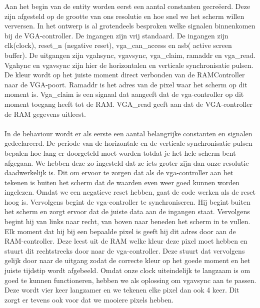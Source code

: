 \documentclass{scrartcl}  %
\begin{document}
Aan het begin van de entity worden eerst een aantal constanten gecreëerd. Deze zijn afgesteld op de grootte van ons resolutie en hoe snel we het scherm willen verversen. In het ontwerp is al grotendeels besproken welke signalen binnenkomen bij de VGA-controller. De ingangen zijn vrij standaard. De ingangen zijn clk(clock), reset\_n (negative reset), vga\_can\_access en asb( active screen buffer). De uitgangen zijn vgahsync, vgavsync, vga\_claim, ramaddr en vga\_read. Vgahync en vgavsync zijn hier de horizontalen en verticale synchronisatie pulsen. De kleur wordt op het juiste moment direct verbonden van de RAMController naar de VGA-poort. Ramaddr is het adres van de pixel waar het scherm op dit moment is. Vga\_claim is een signaal dat aangeeft dat de vga-controller op dit moment toegang heeft tot de RAM. VGA\_read geeft aan dat de VGA-controller de RAM gegevens uitleest.
\\\\
In de behaviour wordt er als eerste  een aantal belangrijke constanten en signalen gedeclareerd. De periode van de horizontale en de verticale synchronisatie pulsen bepalen hoe lang er doorgeteld moet worden totdat je het hele scherm bent afgegaan. We hebben deze zo ingesteld dat ze iets groter zijn dan onze resolutie daadwerkelijk is. Dit om ervoor te zorgen dat als de vga-controller aan het tekenen is buiten het scherm dat de waarden even weer goed kunnen worden ingelezen. Omdat we een negatieve reset hebben, gaat de code werken als de reset hoog is. Vervolgens begint de vga-controller te synchroniseren. Hij begint buiten het scherm en zorgt ervoor dat de juiste data aan de ingangen staat. Vervolgens begint hij van links naar recht, van boven naar beneden het scherm in te vullen. Elk moment dat hij bij een bepaalde pixel is geeft hij dit adres door aan de RAM-controller. Deze leest uit de RAM welke kleur deze pixel moet hebben en stuurt dit rechtstreeks door naar de vga-controller. Deze stuurt dat vervolgens gelijk door naar de uitgang zodat de correcte kleur op het goede moment en het juiste tijdstip wordt afgebeeld. Omdat onze clock uiteindelijk te langzaam is om goed te kunnen functioneren, hebben we als oplossing om vgavsync aan te passen. Deze wordt vier keer langzamer en we tekenen elke pixel dan ook 4 keer. Dit zorgt er tevens ook voor dat we mooiere pixels hebben. 
\end{document}
